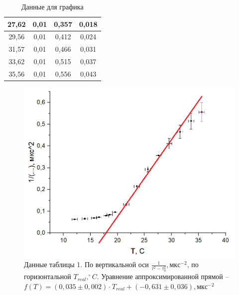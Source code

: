 \begin{table}[hbt]
\begin{tabular}{|c|c|c|c|}
27,62                           & 0,01                          & 0,357                                                      & 0,018                                                      \\ \hline
29,56                           & 0,01                          & 0,412                                                      & 0,024                                                      \\ \hline
31,57                           & 0,01                          & 0,466                                                      & 0,031                                                      \\ \hline
33,62                           & 0,01                          & 0,515                                                      & 0,037                                                      \\ \hline
35,56                           & 0,01                          & 0,556                                                      & 0,043                                                      \\ \hline
\end{tabular}
\caption{Данные для графика}
\end{table}

\begin{figure}[hbt]
    \centering
    \includegraphics[scale = 0.8]{lab324ris2.png}
    \caption{Данные таблицы 1. По вертикальной оси $\frac{1}{\tau^2-\tau_0^2}, мкс^{-2}$, по горизонтальной $T_{real}, ^\circ C$. Уравнение аппроксимированной прямой -- $f(T) = (0,035\pm0,002)\cdot T_{real} + (-0,631\pm0,036), мкс^{-2}$}
\end{figure}




